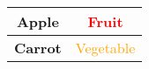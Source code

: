 \begingroup
    \def\cellA{\textbf{Apple}}
    \def\cellB{\textcolor{red}{Fruit}}
    \def\cellC{\textbf{Carrot}}
    \def\cellD{\textcolor{orange}{Vegetable}}
    
    \begin{center}
        \begin{tabular}{|c|c|}
        \hline
        \cellA & \cellB \\ \hline
        \cellC & \cellD \\ \hline
        \end{tabular}
    \end{center}
    \medskip
\endgroup